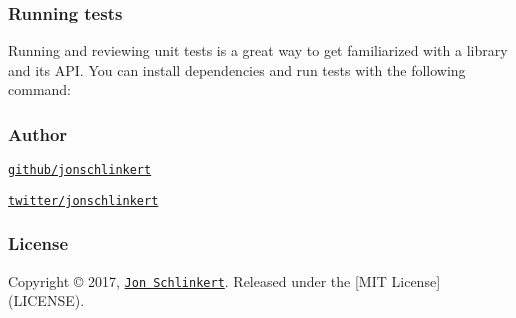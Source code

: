 {\ttfamily \subsubsection*{Running tests}}

{\ttfamily }

{\ttfamily Running and reviewing unit tests is a great way to get familiarized with a library and its A\+PI. You can install dependencies and run tests with the following command\+:}

{\ttfamily 
{}
}

{\ttfamily \subsubsection*{Author}}

{\ttfamily }

{}

{\ttfamily 
\begin{DoxyItemize}
\item \href{https://github.com/jonschlinkert}{\tt github/jonschlinkert}
\item \href{https://twitter.com/jonschlinkert}{\tt twitter/jonschlinkert}
\end{DoxyItemize}}

{\ttfamily \subsubsection*{License}}

{\ttfamily }

{\ttfamily Copyright © 2017, \href{https://github.com/jonschlinkert}{\tt Jon Schlinkert}. Released under the \mbox{[}M\+IT License\mbox{]}(L\+I\+C\+E\+N\+SE).}

{\ttfamily 

}

{ }